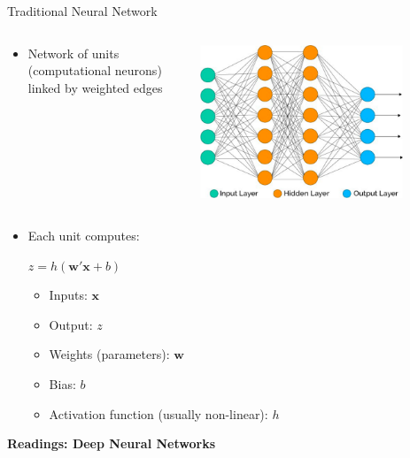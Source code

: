 \documentclass[11pt,table]{beamer}
\begin{document}
\begin{frame}{Traditional Neural Network}

\begin{columns}[T]
\begin{column}{0.4\textwidth}

\begin{itemize}
\item  Network of units  (computational neurons)  linked by weighted edges
\end{itemize}
\end{column}
\begin{column}{0.6\textwidth}
\centering
\includegraphics[width=0.8\textwidth]{figures/4.png}
\end{column}
\end{columns}

\begin{itemize}
    \item Each unit computes: 

    $z=h(\boldsymbol{w}'\boldsymbol{x}+b)$

    \begin{itemize}
        \item Inputs: $\boldsymbol{x}$
\item Output: $z$
\item Weights (parameters): $\boldsymbol{w}$
\item Bias: $b$
\item Activation function (usually non-linear): $h$
 
    \end{itemize}
\end{itemize}
\begin{footnotesize}
\textbf{Readings: Deep Neural Networks}
\citet[][chapters 6, 7, 8]{goodfellow2016deep}
\end{footnotesize}
\end{frame}
\end{document}
